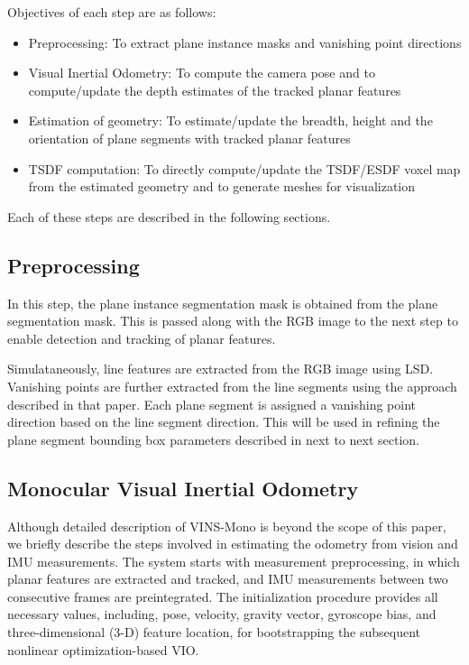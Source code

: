 Objectives of each step are as follows:
\begin{itemize}
    \item Preprocessing: To extract plane instance masks and vanishing point directions
    \item Visual Inertial Odometry: To compute the camera pose and to compute/update the depth estimates of the tracked planar features
    \item Estimation of geometry: To estimate/update the breadth, height and the orientation of plane segments with tracked planar features
    \item TSDF computation: To directly compute/update the TSDF/ESDF  voxel map from the estimated geometry and to generate meshes for visualization
\end{itemize}

Each of these steps are described in the following sections.

\subsection{Preprocessing}
In this step, the plane instance segmentation mask is obtained from the plane segmentation mask. This is passed along with the RGB image to the next step to enable detection and tracking of planar features.

Simulataneously, line features are extracted from the RGB image using LSD. Vanishing points are further extracted from the line segments using the approach described in that paper. Each plane segment is assigned a vanishing point direction based on the line segment direction. This will be used in refining the plane segment bounding box parameters described in next to next section. 

\subsection{Monocular Visual Inertial Odometry}
Although detailed description of VINS-Mono is beyond the scope of this paper, we briefly describe the steps involved in estimating the odometry from vision and IMU measurements. 
The system starts with measurement preprocessing, in which planar features are extracted and tracked, and IMU measurements between two consecutive frames are preintegrated. The initialization procedure provides all necessary values, including, pose, velocity, gravity vector, gyroscope bias, and three-dimensional (3-D) feature location, for bootstrapping
the subsequent nonlinear optimization-based VIO.

